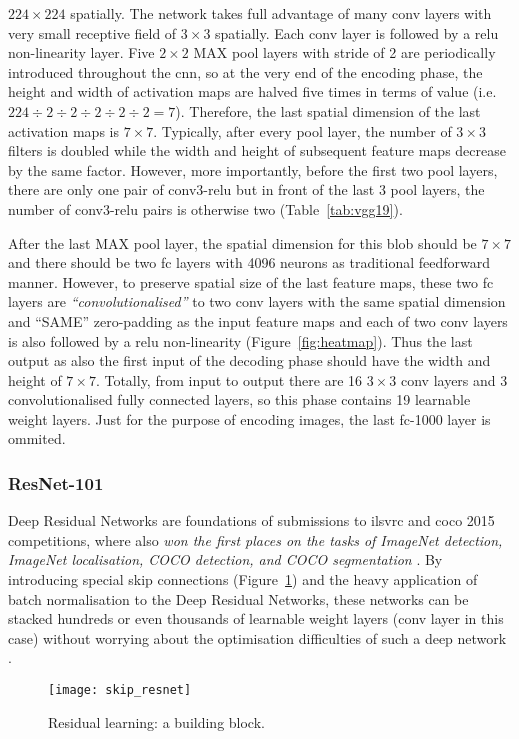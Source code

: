$224 \times 224$ spatially. The network takes full advantage of many
\acrshort{conv} layers with very small receptive field of $3 \times 3$ spatially.
Each \acrshort{conv} layer is followed by a \acrshort{relu} non-linearity layer.
Five $2 \times 2$ MAX \acrshort{pool} layers with stride of 2 are periodically
introduced throughout the \acrshort{cnn}, so at the very end of the encoding
phase, the height and width of activation maps are halved five times in terms of
value (i.e. $224 \div 2 \div 2 \div 2 \div 2 \div 2 = 7$). Therefore, the last
spatial dimension of the last activation maps is $7 \times 7$. Typically, after
every \acrshort{pool} layer, the number of $3 \times 3$ filters is doubled while
the width and height of subsequent feature maps decrease by the same factor.
However, more importantly, before the first two \acrshort{pool} layers, there are only
one pair of \acrshort{conv}3-\acrshort{relu} but in front of the last 3 \acrshort{pool}
layers, the number of \acrshort{conv}3-\acrshort{relu} pairs is otherwise two
(Table~\ref{tab:vgg19}).


After the last MAX \acrshort{pool} layer, the spatial dimension for this blob
should be $7 \times 7$ and there should be two \acrshort{fc} layers with 4096
neurons as traditional feedforward manner. However, to preserve spatial size of
the last feature maps, these two \acrshort{fc} layers are
\emph{``convolutionalised''} \cite{Long_2015_CVPR} to two \acrshort{conv}
layers with the same spatial dimension and ``SAME'' zero-padding as the input
feature maps and each of two \acrshort{conv} layers is also followed by a
\acrshort{relu} non-linearity (Figure~\ref{fig:heatmap}). Thus the last output
as also the first input of the decoding phase should have the width and height
of $7 \times 7$. Totally, from input to output there are 16 $3 \times 3$
\acrshort{conv} layers and 3 convolutionalised fully connected layers, so this
phase contains 19 learnable weight layers. Just for the purpose of encoding
images, the last \acrshort{fc}-1000 layer is ommited.


\subsubsection{ResNet-101}
Deep Residual Networks are foundations of submissions to \acrshort{ilsvrc} and
\acrfull{coco} \cite{DBLP:journals/corr/LinMBHPRDZ14} 2015 competitions, where
also \emph{won the first places on the tasks of ImageNet detection, ImageNet
localisation, COCO detection, and COCO segmentation} \cite{ILSVRC15_results}.
By introducing special skip connections (Figure~\ref{fig:skip_resnet}) and the
heavy application of batch normalisation to the Deep Residual Networks, these
networks can be stacked hundreds or even thousands of learnable weight layers
(\acrshort{conv} layer in this case) without worrying about the optimisation
difficulties of such a deep network \cite{DBLP:journals/corr/HeZRS15}.
\begin{figure}[h]
    \centering
    \texttt{[image: skip\_resnet]}
    \caption{Residual learning: a building block.}
    \label{fig:skip_resnet}
\end{figure}


